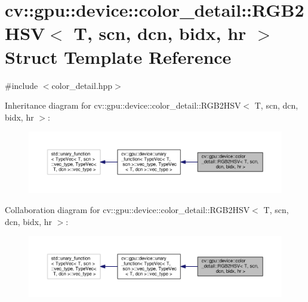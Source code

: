 \hypertarget{structcv_1_1gpu_1_1device_1_1color__detail_1_1RGB2HSV}{\section{cv\-:\-:gpu\-:\-:device\-:\-:color\-\_\-detail\-:\-:R\-G\-B2\-H\-S\-V$<$ T, scn, dcn, bidx, hr $>$ Struct Template Reference}
\label{structcv_1_1gpu_1_1device_1_1color__detail_1_1RGB2HSV}
}


{\ttfamily \#include $<$color\-\_\-detail.\-hpp$>$}



Inheritance diagram for cv\-:\-:gpu\-:\-:device\-:\-:color\-\_\-detail\-:\-:R\-G\-B2\-H\-S\-V$<$ T, scn, dcn, bidx, hr $>$\-:\nopagebreak
\begin{figure}[H]
\begin{center}
\leavevmode
\includegraphics[width=350pt]{structcv_1_1gpu_1_1device_1_1color__detail_1_1RGB2HSV__inherit__graph}
\end{center}
\end{figure}


Collaboration diagram for cv\-:\-:gpu\-:\-:device\-:\-:color\-\_\-detail\-:\-:R\-G\-B2\-H\-S\-V$<$ T, scn, dcn, bidx, hr $>$\-:\nopagebreak
\begin{figure}[H]
\begin{center}
\leavevmode
\includegraphics[width=350pt]{structcv_1_1gpu_1_1device_1_1color__detail_1_1RGB2HSV__coll__graph}
\end{center}
\end{figure}
